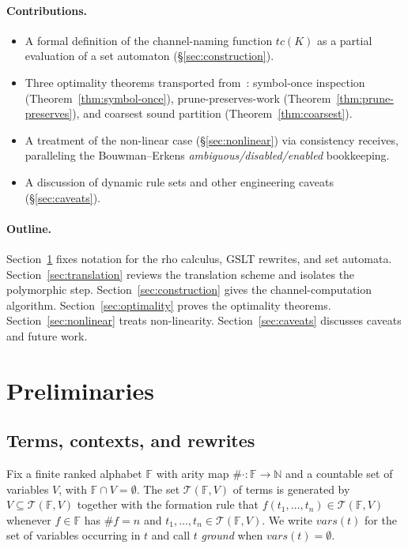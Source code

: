 \documentclass[11pt]{article}
\theoremstyle{plain}
\theoremstyle{definition}
\theoremstyle{remark}
\newcommand{\Terms}{\mathcal{T}}
\newcommand{\arity}[1]{\##1}
\begin{document}
\paragraph{Contributions.}
\begin{itemize}[leftmargin=*]
  \item A formal definition of the channel-naming function $tc(K)$ as a
        partial evaluation of a set automaton (\S\ref{sec:construction}).
  \item Three optimality theorems transported from~\cite{BouwmanErkens2022}:
        symbol-once inspection (Theorem~\ref{thm:symbol-once}),
        prune-preserves-work (Theorem~\ref{thm:prune-preserves}), and
        coarsest sound partition (Theorem~\ref{thm:coarsest}).
  \item A treatment of the non-linear case
        (\S\ref{sec:nonlinear}) via consistency receives, paralleling
        the Bouwman--Erkens \emph{ambiguous/disabled/enabled} bookkeeping.
  \item A discussion of dynamic rule sets and other engineering caveats
        (\S\ref{sec:caveats}).
\end{itemize}

\paragraph{Outline.}
Section~\ref{sec:prelim} fixes notation for the rho calculus, GSLT rewrites,
and set automata. Section~\ref{sec:translation} reviews the translation
scheme and isolates the polymorphic step.
Section~\ref{sec:construction} gives the channel-computation algorithm.
Section~\ref{sec:optimality} proves the optimality theorems.
Section~\ref{sec:nonlinear} treats non-linearity.
Section~\ref{sec:caveats} discusses caveats and future work.

\section{Preliminaries}\label{sec:prelim}

\subsection{Terms, contexts, and rewrites}

Fix a finite ranked alphabet $\mathbb{F}$ with arity map
$\arity{\cdot} : \mathbb{F} \to \mathbb{N}$ and a countable set of
variables $V$, with $\mathbb{F} \cap V = \emptyset$. The set
$\Terms(\mathbb{F}, V)$ of terms is generated by $V \subseteq
\Terms(\mathbb{F}, V)$ together with the formation rule that
$f(t_{1}, \ldots, t_{n}) \in \Terms(\mathbb{F}, V)$ whenever
$f \in \mathbb{F}$ has $\arity{f} = n$ and $t_{1}, \ldots, t_{n} \in
\Terms(\mathbb{F}, V)$. We write $\mathit{vars}(t)$ for the set of
variables occurring in $t$ and call $t$ \emph{ground} when
$\mathit{vars}(t) = \emptyset$.
\end{document}
